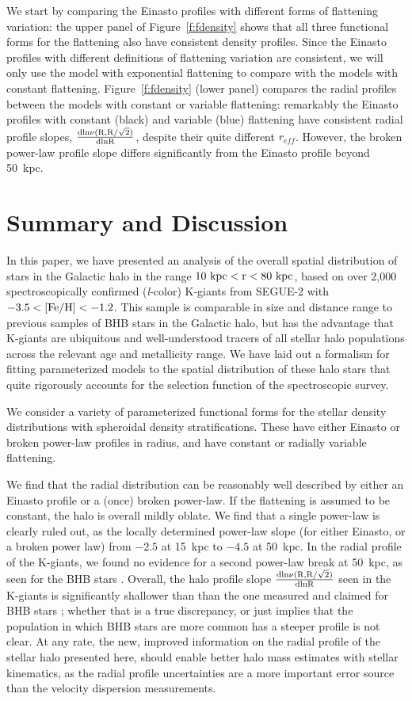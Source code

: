 \documentclass[12pt,preprint]{aastex}
\newcommand{\feh}{{\rm [Fe/H]}}
\begin{document}
We start by comparing the Einasto profiles with different forms of flattening variation: the upper panel of Figure~\ref{f:fdensity} shows that all three functional forms for the flattening also have  consistent density profiles. Since the Einasto profiles with different definitions of flattening variation are consistent, we will only use the model with exponential flattening to compare with the models with constant flattening. Figure~\ref{f:fdensity} (lower panel) compares  the radial profiles between the models with constant or variable flattening: remarkably the Einasto profiles with constant (black) and variable (blue) flattening have consistent radial profile slopes,
$\rm \frac{dln\nu(R,R/\sqrt{2})}{dlnR}$, despite their quite different $r_{eff}$.
However, the broken power-law profile slope differs significantly from the Einasto profile beyond 50~kpc.

\section{Summary and Discussion}\label{sec:Discussion}
In this paper, we have presented an analysis of the overall spatial distribution of stars in the Galactic halo in the range $10~\rm kpc < r < 80~kpc$, based on over 2,000 spectroscopically confirmed (\textit{l}-color) K-giants from SEGUE-2 with $\rm -3.5<\feh<-1.2$. 
This sample is comparable in size and distance range to previous samples of BHB stars in the Galactic halo, but has the advantage that K-giants
are ubiquitous and well-understood tracers of all stellar halo populations across the relevant age and metallicity range.  We have laid out a formalism for fitting parameterized models to the spatial distribution of these halo stars that quite rigorously accounts for the selection function of the spectroscopic survey. 

We consider a variety of parameterized functional forms for the stellar density distributions
with spheroidal density stratifications. These have either  Einasto or broken power-law profiles 
in radius, and have constant or radially variable flattening. 

We find that the radial distribution can be reasonably well described by either an Einasto profile or a (once) broken power-law. If the flattening is assumed to be constant, the halo is overall mildly oblate. We find that a single power-law is clearly ruled out, as the locally determined power-law slope (for either Einasto, or a broken power law) from $-2.5$ at 15~kpc to $-4.5$ at 50~kpc. In the radial profile of the K-giants, we found no evidence for a second power-law break at 50~kpc, as seen for the BHB stars \citep{Deason2014}. Overall, the halo profile slope
$\rm \frac{dln\nu(R,R/\sqrt{2})}{dlnR}$ seen in the K-giants is significantly shallower than than the one measured and claimed for BHB stars \citep{Deason2014}; whether that is a true discrepancy, or just implies that the population in which BHB stars are more common has 
a steeper profile is not clear.  At any rate, the new, improved information on the radial profile of the stellar halo presented here, should enable better halo mass estimates with stellar kinematics, as the radial profile uncertainties are a more important error source than the velocity dispersion measurements. 
\end{document}
